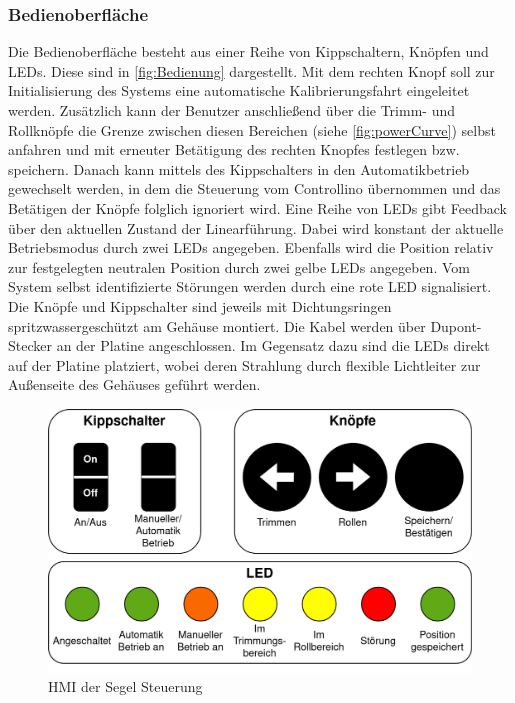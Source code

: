 \subsubsection{Bedienoberfläche}
\noindent Die Bedienoberfläche besteht aus einer Reihe von Kippschaltern, Knöpfen und LEDs. Diese sind in \autoref{fig:Bedienung} dargestellt. Mit dem rechten Knopf soll zur Initialisierung des Systems eine automatische Kalibrierungsfahrt eingeleitet werden. Zusätzlich kann der Benutzer anschließend über die Trimm- und Rollknöpfe die Grenze zwischen diesen Bereichen (siehe \autoref{fig:powerCurve}) selbst anfahren und mit erneuter Betätigung des rechten Knopfes festlegen bzw. speichern. Danach kann mittels des Kippschalters in den Automatikbetrieb gewechselt werden, in dem die Steuerung vom Controllino übernommen und das Betätigen der Knöpfe folglich ignoriert wird.
Eine Reihe von LEDs gibt Feedback über den aktuellen Zustand der Linearführung. Dabei wird konstant der aktuelle Betriebsmodus durch zwei LEDs angegeben. Ebenfalls wird die Position relativ zur festgelegten neutralen Position durch zwei gelbe LEDs angegeben. Vom System selbst identifizierte Störungen werden durch eine rote LED signalisiert.\\
Die Knöpfe und Kippschalter sind jeweils mit Dichtungsringen spritzwassergeschützt am Gehäuse montiert. Die Kabel werden über Dupont-Stecker an der Platine angeschlossen. Im Gegensatz dazu sind die LEDs direkt auf der Platine platziert, wobei deren Strahlung durch flexible Lichtleiter zur Außenseite des Gehäuses geführt werden.
\begin{figure}[H]
	\centering
	\includegraphics[width=1.0\textwidth]{images/Hardware/Bedienung.drawio.png}
	\caption{HMI der Segel Steuerung}
	\label{fig:Bedienung}
\end{figure}
